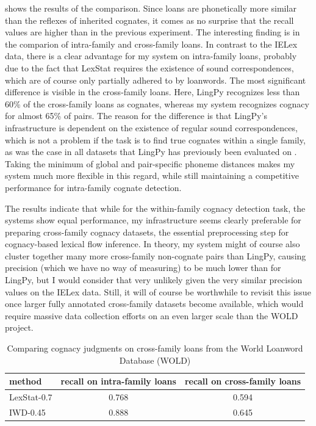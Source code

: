  shows the results of the comparison. Since loans are phonetically more similar than the reflexes of inherited cognates, it comes as no surprise that the recall values are higher than in the previous experiment. The interesting finding is in the comparion of intra-family and cross-family loans. In contrast to the IELex data, there is a clear advantage for my system on intra-family loans, probably due to the fact that LexStat requires the existence of sound correspondences, which are of course only partially adhered to by loanwords. The most significant difference is visible in the cross-family loans. Here, LingPy recognizes less than 60\% of the cross-family loans as cognates, whereas my system recognizes cognacy for almost 65\% of pairs. The reason for the difference is that LingPy's infrastructure is dependent on the existence of regular sound correspondences, which is not a problem if the task is to find true cognates within a single family, as was the case in all datasets 
that LingPy has previously been evaluated on \citep{list_ea_2017}. Taking the minimum of global and pair-specific phoneme distances makes my system much more flexible in this regard, while still maintaining a competitive performance for intra-family cognate detection. 

The results indicate that while for the within-family cognacy detection task, the systems show equal performance, my infrastructure seems clearly preferable for preparing cross-family cognacy datasets, the essential preprocessing step for cognacy-based lexical flow inference. In theory, my system might of course also cluster together many more cross-family non-cognate pairs than LingPy, causing precision (which we have no way of measuring) to be much lower than for LingPy, but I would consider that very unlikely given the very similar precision values on the IELex data. Still, it will of course be worthwhile to revisit this issue once larger fully annotated cross-family datasets become available, which would require massive data collection efforts on an even larger scale than the WOLD project.

\begin{table}
 \centering
\begin{tabular}{lcc}
  \hline \hline
  method & recall on intra-family loans & recall on cross-family loans\\ \hline
  LexStat-0.7 & 0.768 & 0.594\\
  IWD-0.45 & 0.888 & 0.645\\
  \hline
 \end{tabular}
 \caption{Comparing cognacy judgments on cross-family loans from the World Loanword Database (WOLD)}
 \label{lingpyComparisonWOLD}
\end{table}

